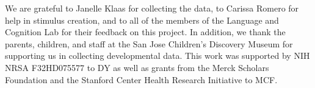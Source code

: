 \documentclass[man,floatsintext]{apa6}
\begin{document}
We are grateful to Janelle Klaas for collecting the data, to Carissa Romero for help in stimulus creation, and to all of the members of the Language and Cognition Lab for their feedback on this project. In addition, we thank the parents, children, and staff at the San Jose Children's Discovery Museum for supporting us in collecting developmental data. This work was supported by NIH NRSA F32HD075577 to DY as well as grants from the Merck Scholars Foundation and the Stanford Center Health Research Initiative to MCF.



\end{document}
